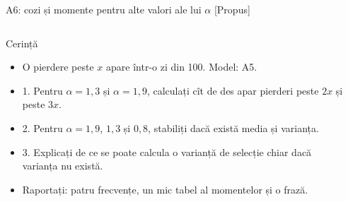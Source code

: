 \begin{frame}{A6: cozi și momente pentru alte valori ale lui $\alpha$ [Propus]}
\propsub
\itemsize{\footnotesize}
\begin{columns}[T]
\begin{column}{\taskw}
\begin{block}{Cerință}
\begin{itemize}
    \item O pierdere peste $x$ apare într-o zi din 100. Model: A5.
    \item 1. Pentru $\alpha = 1{,}3$ și $\alpha = 1{,}9$, calculați cît de des apar pierderi peste $2x$ și peste $3x$.
    \item 2. Pentru $\alpha = 1{,}9$, $1{,}3$ și $0{,}8$, stabiliți dacă există media și varianța.
    \item 3. Explicați de ce se poate calcula o varianță de selecție chiar dacă varianța nu există.
    \item Raportați: patru frecvențe, un mic tabel al momentelor și o frază.
\end{itemize}
\end{block}
\end{column}
\begin{column}{\solw}
\end{column}
\end{columns}
\end{frame}

